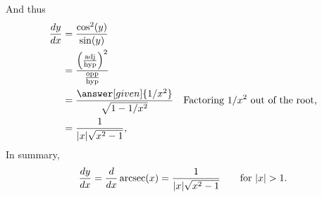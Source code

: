 \documentclass{ximera}
\begin{document}
\begin{theorem}
\begin{explanation}
    And thus
%
%          
%
\begin{align*}
\frac{dy}{dx}&= \frac{\cos^2(y)}{\sin(y)}\\
  &= \frac{
    \left(\frac{\mathrm{adj}}{\mathrm{hyp}}\right)^2}{\frac{\mathrm{opp}}{\mathrm{hyp}}}\\
  &= \frac{\answer[given]{1/x^2}}{\sqrt{1-1/x^2}}&\text{Factoring $1/x^2$ out of the root,}\\
  &= \frac{1}{|x|\sqrt{x^2-1}},
\end{align*}
In summary,
\[
\frac{dy}{dx}= \ddx \arcsec(x) = \frac{1}{|x|\sqrt{x^2-1}}\qquad\text{for $|x|>1$}. 
\]
\end{explanation}
\end{theorem}
\end{document}
